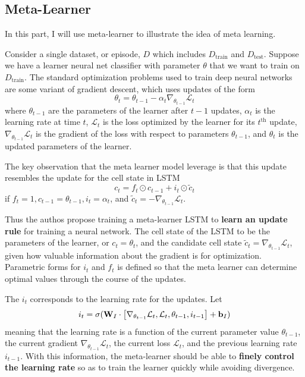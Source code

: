 \documentclass{article}
\begin{document}
\subsection*{Meta-Learner}

In this part, I will use meta-learner \cite{ravi2016optimization} to illustrate the idea of meta learning.

Consider a single dataset, or episode, $D$ which includes $D_{\text{train}}$ and $D_{\text{test}}$. Suppose we have a learner neural net classifier with parameter $\theta$ that we want to train on $D_{\text{train}}$. The standard optimization problems used to train deep neural networks are some variant of gradient descent, which uses updates of the form
\begin{equation}
\theta_t=\theta_{t-1}-\alpha_t\nabla_{\theta_{t-1}}\mathcal{L}_t
\end{equation}
where $\theta_{t-1}$ are the parameters of the learner after $t-1$ updates, $\alpha_t$ is the learning rate at time $t$, $\mathcal{L}_t$ is the loss optimized by the learner for its $t^{\text{th}}$ update, $\nabla_{\theta_{t-1}}\mathcal{L}_t$ is the gradient of the loss with respect to parameters $\theta_{t-1}$, and $\theta_t$ is the updated parameters of the learner. 

The key observation that the meta learner model leverage is that this update resembles the update for the cell state in LSTM
\begin{equation}
c_t=f_t\odot c_{t-1}+i_t\odot\tilde{c}_t
\end{equation}
if $f_t=1,c_{t-1}=\theta_{t-1},i_t=\alpha_t$, and $\tilde{c}_t=-\nabla_{\theta_{t-1}}\mathcal{L}_t$.

Thus the authos propose training a meta-learner LSTM to \textbf{learn an update rule} for training a neural network. The cell state of the LSTM to be the parameters of the learner, or $c_t=\theta_t$, and the candidate cell state $\tilde{c}_t=\nabla_{\theta_{t-1}}\mathcal{L}_t$, given how valuable information about the gradient is for optimization. Parametric forms for $i_t$ and $f_t$ is defined so that the meta learner can determine optimal values through the course of the updates.

The $i_t$ corresponds to the learning rate for the updates. Let
\[
i_t=\sigma(\mathbf{W}_I\cdot\left[\nabla_{\theta_{t-1}}\mathcal{L}_t,\mathcal{L}_t,\theta_{t-1},i_{t-1} \right]+{\bf b}_I)
\]
meaning that the learning rate is a function of the current parameter value $\theta_{t-1}$, the current gradient $\nabla_{\theta_{t-1}}\mathcal{L}_t$, the current loss $\mathcal{L}_t$, and the previous learning rate $i_{t-1}$. With this information, the meta-learner should be able to \textbf{finely control the learning rate} so as to train the learner quickly while avoiding divergence.
\end{document}
